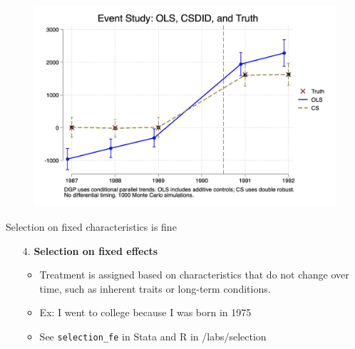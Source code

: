 \documentclass{beamer}
\begin{document}
\begin{frame}
 
\begin{figure}
    \centering
    \includegraphics[width=\textwidth]{./lecture_includes/selection_covariates}
\end{figure}

\end{frame}


\begin{frame}{Selection on fixed characteristics is fine}
\begin{enumerate}
    
    \item[4. ] \textbf{Selection on fixed effects}
    \begin{itemize}
        \item Treatment is assigned based on characteristics that do not change over time, such as inherent traits or long-term conditions.
        \item Ex: I went to college because I was born in 1975
        \item See \texttt{selection_fe} in Stata and R in /labs/selection
    \end{itemize}
    
\end{enumerate}
\end{frame}
\end{document}
